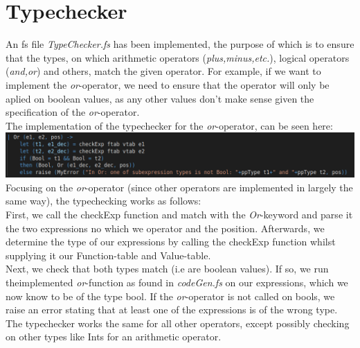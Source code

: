 \section{Typechecker}
An fs file \textit{TypeChecker.fs} has been implemented, the purpose of which is to ensure that the types, on which arithmetic operators (\textit{plus,minus,etc.}), logical operators (\textit{and,or}) and others, match the given operator.
For example, if we want to implement the \textit{or}-operator, we need to ensure that the operator will only be aplied on boolean values, as any other values don't make sense given the specification of the \textit{or}-operator.\\
The implementation of the typechecker for the \textit{or}-operator, can be seen here: \\
\includegraphics[width=\linewidth]{Materials/TypeChecker/Or}\\
Focusing on the \textit{or}-operator (since other operators are implemented in largely the same way), the typechecking works as follows:\\
First, we call the checkExp function and match with the \textit{Or}-keyword and parse it the two expressions no which we operator and the position.
Afterwards, we determine the type of our expressions by calling the checkExp function whilst supplying it our Function-table and Value-table.\\
Next, we check that both types match (i.e are boolean values). If so, we run theimplemented \textit{or}-function as found in \textit{codeGen.fs} on our expressions, which we now know to be of the type bool. If the \textit{or}-operator is not called on bools, we raise an error stating that at least one of the expressions is of the wrong type.\\
The typechecker works the same for all other operators, except possibly checking on other types like Ints for an arithmetic operator. 

